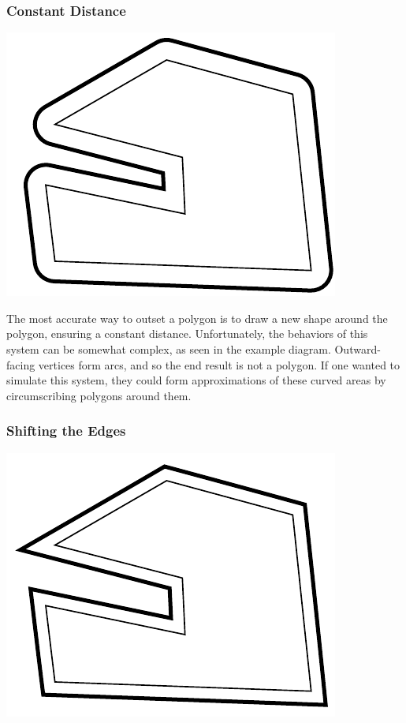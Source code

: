 \documentclass[letterpaper, 12pt]{article}
\begin{document}
\begin{multicols}{2}
\subsubsection{Constant Distance}

\includegraphics[width=\columnwidth]{img/complex_outset.pdf}

The most accurate way to outset a polygon is to draw a new shape around the
polygon, ensuring a constant distance. Unfortunately, the behaviors of this
system can be somewhat complex, as seen in the example diagram. Outward-facing
vertices form arcs, and so the end result is not a polygon. If one wanted to
simulate this system, they could form approximations of these curved areas by
circumscribing polygons around them.

\subsubsection{Shifting the Edges}

\includegraphics[width=\columnwidth]{img/simple_outset.pdf}


\end{multicols}
\end{document}

